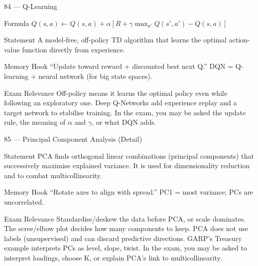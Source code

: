 \documentclass[aspectratio=169,8pt]{beamer}
\begin{document}
	\begin{frame}{84 --- Q-Learning}
		\begin{block}{Formula}
			$Q(s,a) \leftarrow Q(s,a) + \alpha[R + \gamma \max_{a'} Q(s',a') - Q(s,a)]$
		\end{block}
		\begin{block}{Statement}
			A model-free, off-policy TD algorithm that learns the optimal action-value function directly from experience.
		\end{block}
		\begin{block}{Memory Hook}
			``Update toward reward + discounted best next Q.'' DQN = Q-learning + neural network (for big state spaces).
		\end{block}
		\begin{block}{Exam Relevance}
			Off-policy means it learns the optimal policy even while following an exploratory one. Deep Q-Networks add experience replay and a target network to stabilise training. In the exam, you may be asked the update rule, the meaning of $\alpha$ and $\gamma$, or what DQN adds.
		\end{block}
	\end{frame}
	
	\begin{frame}{85 --- Principal Component Analysis (Detail)}
		\begin{block}{Statement}
			PCA finds orthogonal linear combinations (principal components) that successively maximise explained variance. It is used for dimensionality reduction and to combat multicollinearity.
		\end{block}
		\begin{block}{Memory Hook}
			``Rotate axes to align with spread.'' PC1 = most variance; PCs are uncorrelated.
		\end{block}
		\begin{block}{Exam Relevance}
			Standardise/deskew the data before PCA, or scale dominates. The scree/elbow plot decides how many components to keep. PCA does not use labels (unsupervised) and can discard predictive directions. GARP's Treasury example interprets PCs as level, slope, twist. In the exam, you may be asked to interpret loadings, choose K, or explain PCA's link to multicollinearity.
		\end{block}
	\end{frame}
	
\end{document}
